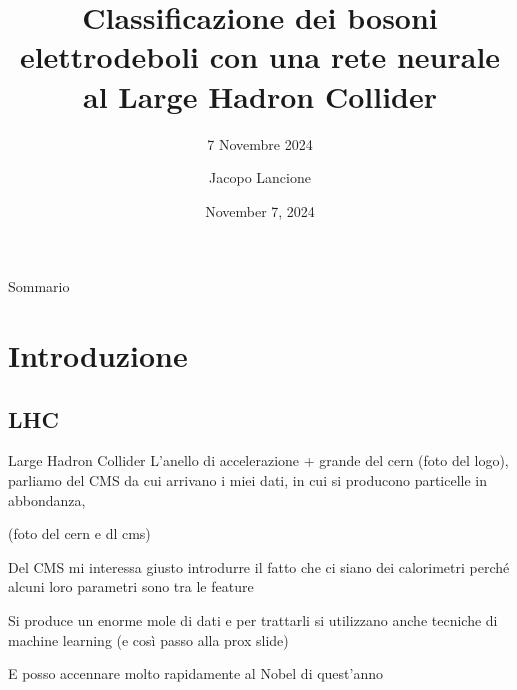 \documentclass{beamer}
\title{Classificazione dei bosoni elettrodeboli con una rete neurale al Large Hadron Collider}
\subtitle{7 Novembre 2024}
\date{November 7, 2024}
\author{Jacopo Lancione}
\begin{document}
\begin{frame}
    \titlepage
\end{frame}

\begin{frame}{Sommario}
    \tableofcontents
\end{frame}


\section{Introduzione}
\subsection{LHC}
\begin{frame}{Large Hadron Collider}
  L'anello di accelerazione + grande del cern (foto del logo), parliamo del CMS da cui arrivano i miei dati, in cui si producono particelle in abbondanza,

  (foto del cern e dl cms)

  Del CMS mi interessa giusto introdurre il fatto che ci siano dei calorimetri perché alcuni loro parametri sono tra le feature

  Si produce un enorme mole di dati e per trattarli si utilizzano anche tecniche di machine learning (e così passo alla prox slide)

  E posso accennare molto rapidamente al Nobel di quest'anno
\end{frame}
\end{document}
